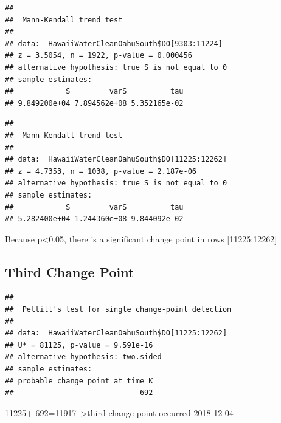 \documentclass[12pt,]{article}
\newenvironment{Shaded}{\begin{snugshade}}{\end{snugshade}}
\newcommand{\KeywordTok}[1]{\textcolor[rgb]{0.13,0.29,0.53}{\textbf{#1}}}
\newcommand{\DecValTok}[1]{\textcolor[rgb]{0.00,0.00,0.81}{#1}}
\newcommand{\OperatorTok}[1]{\textcolor[rgb]{0.81,0.36,0.00}{\textbf{#1}}}
\newcommand{\NormalTok}[1]{#1}
\begin{document}
\begin{verbatim}
## 
##  Mann-Kendall trend test
## 
## data:  HawaiiWaterCleanOahuSouth$DO[9303:11224]
## z = 3.5054, n = 1922, p-value = 0.000456
## alternative hypothesis: true S is not equal to 0
## sample estimates:
##            S         varS          tau 
## 9.849200e+04 7.894562e+08 5.352165e-02
\end{verbatim}

\begin{Shaded}
\end{Shaded}

\begin{verbatim}
## 
##  Mann-Kendall trend test
## 
## data:  HawaiiWaterCleanOahuSouth$DO[11225:12262]
## z = 4.7353, n = 1038, p-value = 2.187e-06
## alternative hypothesis: true S is not equal to 0
## sample estimates:
##            S         varS          tau 
## 5.282400e+04 1.244360e+08 9.844092e-02
\end{verbatim}

Because p\textless{}0.05, there is a significant change point in rows
{[}11225:12262{]}

\subsection{Third Change Point}\label{third-change-point}

\begin{Shaded}
\end{Shaded}

\begin{verbatim}
## 
##  Pettitt's test for single change-point detection
## 
## data:  HawaiiWaterCleanOahuSouth$DO[11225:12262]
## U* = 81125, p-value = 9.591e-16
## alternative hypothesis: two.sided
## sample estimates:
## probable change point at time K 
##                             692
\end{verbatim}

11225+ 692=11917--\textgreater{}third change point occurred 2018-12-04
\end{document}
